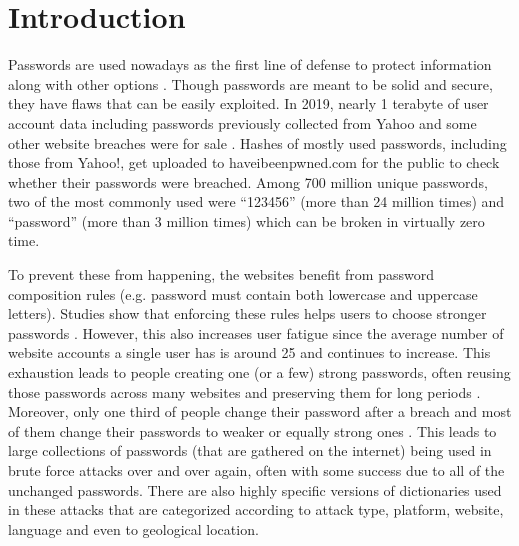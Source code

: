 \documentclass[acmsmall,nonacm]{acmart}
\begin{document}



\maketitle

\section{Introduction}
Passwords are used nowadays as the first line of defense to protect information along with other options \cite{ma_2010}. Though passwords are meant to be solid and secure, they have flaws that can be easily exploited. In 2019, nearly 1 terabyte of user account data including passwords previously collected from Yahoo and some other website breaches were for sale \cite{hunt_2019}. Hashes of mostly used passwords, including those from Yahoo!, get uploaded to haveibeenpwned.com for the public to check whether their passwords were breached. Among 700 million unique passwords, two of the most commonly used were “123456” (more than 24 million times) and “password” (more than 3 million times) which can be broken in virtually zero time.


To prevent these from happening, the websites benefit from password composition rules (e.g. password must contain both lowercase and uppercase letters). Studies show that enforcing these rules helps users to choose stronger passwords \cite{shay_2010}. However, this also increases user fatigue since the average number of website accounts a single user has is around 25 \cite{lee_2014,waugh_2012}  and continues to increase. This exhaustion leads to people creating one (or a few) strong passwords, often reusing those passwords across many websites \cite{das_2014} and preserving them for long periods \cite{bhagavatula_2020,florencio_2007}. Moreover, only one third of people change their password after a breach and most of them change their passwords to weaker or equally strong ones \cite{bhagavatula_2020}. This leads to large collections of passwords (that are gathered on the internet) being used in brute force attacks over and over again, often with some success due to all of the unchanged passwords. There are also highly specific versions of dictionaries used in these attacks that are categorized according to attack type, platform, website, language and even to geological location.
\end{document}

